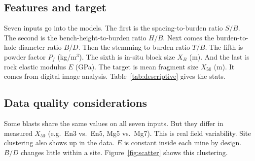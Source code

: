\documentclass[conference]{IEEEtran}
\begin{document}
\subsection{Features and target}
Seven inputs go into the models. The first is the spacing-to-burden ratio $S/B$. The second is the bench-height-to-burden ratio $H/B$. Next comes the burden-to-hole-diameter ratio $B/D$. Then the stemming-to-burden ratio $T/B$. The fifth is powder factor $P_f$ (kg/m$^3$). The sixth is in-situ block size $X_B$ (m). And the last is rock elastic modulus $E$ (GPa). The target is mean fragment size $X_{50}$ (m). It comes from digital image analysis. Table~\ref{tab:descriptive} gives the stats.

\begin{table}[t]
\centering
\caption{Descriptive statistics of input and target variables (110 blasts)}
\label{tab:descriptive}
\footnotesize
{}
\end{table}

\subsection{Data quality considerations}
\label{sec:leakage}
Some blasts share the same values on all seven inputs. But they differ in
measured $X_{50}$ (e.g.\ En3 vs.\ En5, Mg5 vs.\ Mg7). This is real field variability. Site clustering also shows up in the data. $E$ is constant inside each mine by design. $B/D$ changes little within a site.
Figure~\ref{fig:scatter} shows this clustering.
\end{document}

